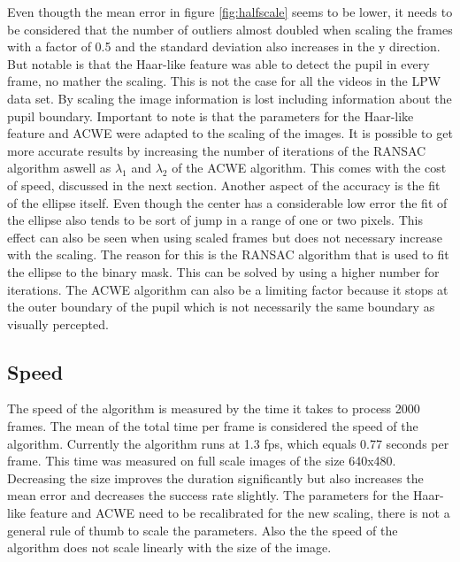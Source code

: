 Even thougth the mean error in figure \ref{fig:halfscale} seems to be lower, it needs to be considered that the number of outliers almost doubled when scaling the frames with a factor of 0.5 and the standard deviation also increases in the y direction. But notable is that the Haar-like feature was able to detect the pupil in every frame, no mather the scaling. This is not the case for all the videos in the LPW data set. By scaling the image information is lost including information about the pupil boundary. Important to note is that the parameters for the Haar-like feature and ACWE were adapted to the scaling of the images. 
It is possible to get more accurate results by increasing the number of iterations of the RANSAC algorithm aswell as $\lambda_1$ and $\lambda_2$ of the ACWE algorithm. This comes with the cost of speed, discussed in the next section. 
Another aspect of the accuracy is the fit of the ellipse itself. Even though the center has a considerable low error the fit of the ellipse also tends to be sort of jump in a range of one or two pixels. This effect can also be seen when using scaled frames but does not necessary increase with the scaling. The reason for this is the RANSAC algorithm that is used to fit the ellipse to the binary mask. This can be solved by using a higher number for iterations. The ACWE algorithm can also be a limiting factor because it stops at the outer boundary of the pupil which is not necessarily the same boundary as visually percepted.
\subsection{Speed}
The speed of the algorithm is measured by the time it takes to process 2000 frames. The mean of the total time per frame is considered the speed of the algorithm. Currently the algorithm runs at 1.3 fps, which equals 0.77 seconds per frame. This time was measured on full scale images of the size 640x480. Decreasing the size improves the duration significantly but also increases the mean error and decreases the success rate slightly. The parameters for the Haar-like feature and ACWE need to be recalibrated for the new scaling, there is not a general rule of thumb to scale the parameters. Also the the speed of the algorithm does not scale linearly with the size of the image.
